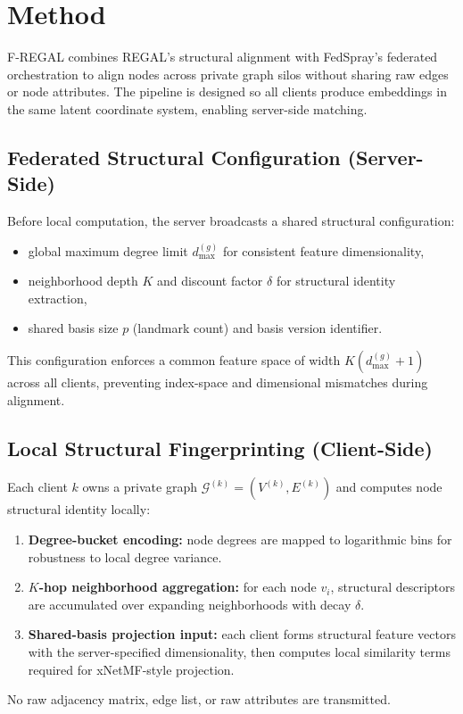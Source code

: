 \section{Method}
F-REGAL combines REGAL's structural alignment with FedSpray's federated orchestration to align nodes across private graph silos without sharing raw edges or node attributes. The pipeline is designed so all clients produce embeddings in the same latent coordinate system, enabling server-side matching.

\subsection{Federated Structural Configuration (Server-Side)}
Before local computation, the server broadcasts a shared structural configuration:
\begin{itemize}[leftmargin=*]
    \item global maximum degree limit $d_{\max}^{(g)}$ for consistent feature dimensionality,
    \item neighborhood depth $K$ and discount factor $\delta$ for structural identity extraction,
    \item shared basis size $p$ (landmark count) and basis version identifier.
\end{itemize}
This configuration enforces a common feature space of width $K(d_{\max}^{(g)}+1)$ across all clients, preventing index-space and dimensional mismatches during alignment.

\subsection{Local Structural Fingerprinting (Client-Side)}
Each client $k$ owns a private graph $\mathcal{G}^{(k)}=(V^{(k)},E^{(k)})$ and computes node structural identity locally:
\begin{enumerate}[leftmargin=*]
    \item \textbf{Degree-bucket encoding:} node degrees are mapped to logarithmic bins for robustness to local degree variance.
    \item \textbf{$K$-hop neighborhood aggregation:} for each node $v_i$, structural descriptors are accumulated over expanding neighborhoods with decay $\delta$.
    \item \textbf{Shared-basis projection input:} each client forms structural feature vectors with the server-specified dimensionality, then computes local similarity terms required for xNetMF-style projection.
\end{enumerate}
No raw adjacency matrix, edge list, or raw attributes are transmitted.

